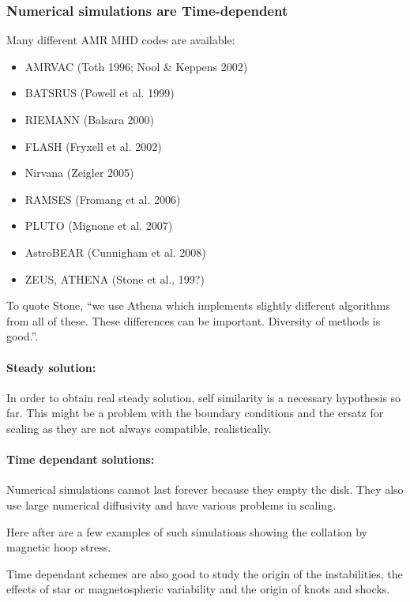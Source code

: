 \documentclass[10pt,a4paper,english,draft]{article}
\begin{document}
\subsubsection{Numerical simulations are Time-dependent}
Many different AMR MHD codes are available:
\begin{itemize}
\item AMRVAC (Toth 1996; Nool \& Keppens 2002)
\item BATSRUS (Powell et al. 1999)
\item RIEMANN (Balsara 2000)
\item FLASH (Fryxell et al. 2002)
\item Nirvana (Zeigler 2005)
\item RAMSES (Fromang et al. 2006)
\item PLUTO (Mignone et al. 2007)
\item AstroBEAR (Cunnigham et al. 2008)
\item ZEUS, ATHENA (Stone et al., 199?)
\end{itemize}
To quote Stone, ``we use Athena which implements slightly different algorithms from all of these. These differences can be important. Diversity of methods is good.''.

\paragraph{Steady solution:}

In order to obtain real steady solution, self similarity is a necessary hypothesis so far. This might be a problem with the boundary conditions and the ersatz for scaling as they are not always compatible, realistically.

\paragraph{Time dependant solutions:}

Numerical simulations cannot last forever because they empty the disk. They also use large numerical diffusivity and have various problems in scaling.

Here after are a few examples of such simulations showing the collation by magnetic hoop stress.

Time dependant schemes are also good to study the origin of the instabilities, the effects of star or magnetospheric variability and the origin of knots and shocks.

\end{document}
